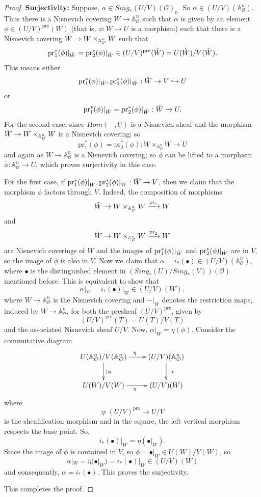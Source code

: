 \documentclass[10pt,a4paper]{amsart}
\newcommand{\A}{{\mathbb A}}
\newcommand{\sO}{{\mathcal O}}
\begin{document}
\begin{proof}
\textbf{Surjectivity: } Suppose, $\alpha \in Sing_*(U/V)(\mathcal{O})_n$. So $\alpha \in (U/V)(\mathbb{A}^n_{\mathcal{O}})$. Thus there is a Nisnevich covering $W \to \mathbb{A}^n_{\mathcal{O}}$ such that $\alpha$ is given by an element $\phi \in (U/V)^{\text{pre}}(W)$ (that is, $\phi: W \to U$ is a morphism) such that there is a Nisnevich covering $\Tilde{W} \to W \times_{\mathbb{A}^n_{\mathcal{O}}} W$ such that 
$$\text{pr}_1^*(\phi)|_{\Tilde{W}} = \text{pr}_2^*(\phi)|_{\Tilde{W}} \in (U/V)^{\text{pre}}(\Tilde{W}) = U(\Tilde{W})/V(\Tilde{W}).$$
This means either 
$$\text{pr}_1^*(\phi)|_{\Tilde{W}}, \text{pr}_2^*(\phi)|_{\Tilde{W}} : \Tilde{W} \to V \hookrightarrow U$$
or
$$\text{pr}_1^*(\phi)|_{\Tilde{W}} = \text{pr}_2^*(\phi)|_{\Tilde{W}} : \Tilde{W} \to U.$$
For the second case, since $Hom(-, U)$ is a Nisnevich sheaf and the morphism $\Tilde{W} \to W \times_{\mathbb{A}^n_{\mathcal{O}}} W$ is a Nisnevich covering; so 
$$\text{pr}_1^*(\phi) = \text{pr}_2^*(\phi) : W \times_{\mathbb{A}^n_{\mathcal{O}}} W \to U$$
and again as $W \to \mathbb{A}^n_{\mathcal{O}}$ is a Nisnevich covering; so $\phi$ can be lifted to a morphism $\bar{\phi}: \mathbb{A}^n_{\mathcal{O}} \to U$, which proves surjectivity in this case. \par
For the first case, if $\text{pr}_1^*(\phi)|_{\Tilde{W}}, \text{pr}_2^*(\phi)|_{\Tilde{W}} : \Tilde{W} \to V$, then we claim that the morphism $\phi$ factors through $V$. Indeed, the composition of morphisms
$$\Tilde{W} \to W \times_{\mathbb{A}^n_{\mathcal{O}}} W \xrightarrow{\text{pr}_1} W$$
and 
$$\Tilde{W} \to W \times_{\mathbb{A}^n_{\mathcal{O}}} W \xrightarrow{\text{pr}_2} W$$
are Nisnevich coverings of $W$ and the images of $\text{pr}_1^*(\phi)|_{\Tilde{W}}$ and $\text{pr}_2^*(\phi)|_{\Tilde{W}}$ are in $V$, so the image of $\phi$ is also in $V$. Now we claim that $\alpha = i_*(\bullet) \in (U/V)(\mathbb{A}^n_{\mathcal{O}})$, where $\bullet$ is the distinguished element in $(Sing_*(U)/Sing_*(V))(\mathcal{O})$ mentioned before. This is equivalent to show that 
$$\alpha|_W = i_*(\bullet)|_W \in (U/V)(W),$$
where $W \to \mathbb{A}^n_{\mathcal{O}}$ is the Nisnevich covering and $-|_W$ denotes the restriction maps, induced by $W \to \A^n_\sO$, for both the presheaf $(U/V)^{\text{pre}}$, given by 
$$(U/V)^{\text{pre}}(T) = U(T)/V(T)$$
and the associated Nisnevich sheaf $U/V$.
Now, $\alpha|_W = \eta(\phi)$. Consider the commutative diagram
 \[
\xymatrix{
U(\A^n_\sO)/V(\A^n_\sO) \ar[r]^\eta \ar[d]^{|_W} & (U/V)(\A^n_\sO) \ar[d]^{|_W} \\
U(W)/V(W) \ar[r]_\eta & (U/V)(W)
}
\]
where 
$$\eta: (U/V)^{\text{pre}} \to U/V$$ 
is the sheafification morphism and in the square, the left vertical morphism respects the base point. So,
$$i_*(\bullet)|_W = \eta(\bullet|_W).$$
Since the image of $\phi$ is contained in $V$, so $\phi = \bullet|_W \in U(W)/V(W)$, so 
$$\alpha|_W =\eta(\bullet|_W)= i_*(\bullet)|_W \in (U/V)(W)$$ 
and consequently, $\alpha = i_*(\bullet)$. This proves the surjectivity. 

This completes the proof.
\end{proof}
\end{document}
